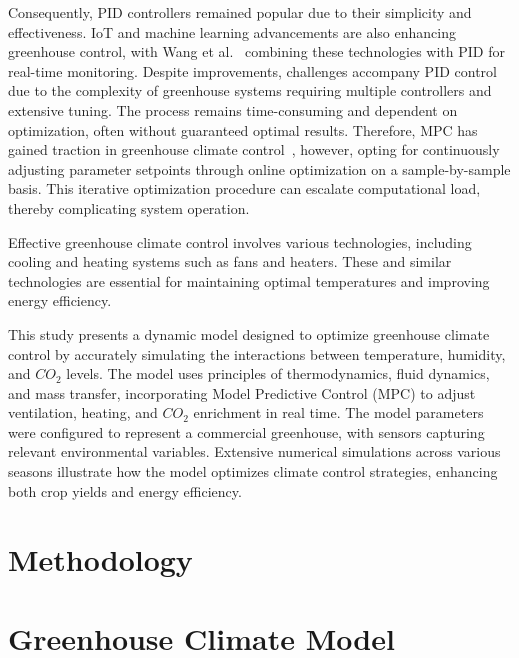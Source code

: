 \documentclass[conference]{IEEEtran}
\begin{document}
Consequently, PID controllers remained popular due to their simplicity and effectiveness. IoT and machine learning advancements are also enhancing greenhouse control, with Wang et al.~\cite{Wang2024} combining these technologies with PID for real-time monitoring. Despite improvements, challenges accompany PID control due to the complexity of greenhouse systems requiring multiple controllers and extensive tuning. The process remains time-consuming and dependent on optimization, often without guaranteed optimal results. Therefore, MPC has gained traction in greenhouse climate control~\cite{Hu2022}, however, opting for continuously adjusting parameter setpoints through online optimization on a sample-by-sample basis. This iterative optimization procedure can escalate computational load, thereby complicating system operation.



Effective greenhouse climate control involves various technologies, including cooling and heating systems such as fans and heaters. These and similar technologies are essential for maintaining optimal temperatures and improving energy efficiency.

This study presents a dynamic model designed to optimize greenhouse climate control by accurately simulating the interactions between temperature, humidity, and \(CO_2\) levels. The model uses principles of thermodynamics, fluid dynamics, and mass transfer, incorporating Model Predictive Control (MPC) to adjust ventilation, heating, and \(CO_2\) enrichment in real time. The model parameters were configured to represent a commercial greenhouse, with sensors capturing relevant environmental variables. Extensive numerical simulations across various seasons illustrate how the model optimizes climate control strategies, enhancing both crop yields and energy efficiency.


\section{Methodology}

\section{Greenhouse Climate Model}
\end{document}
